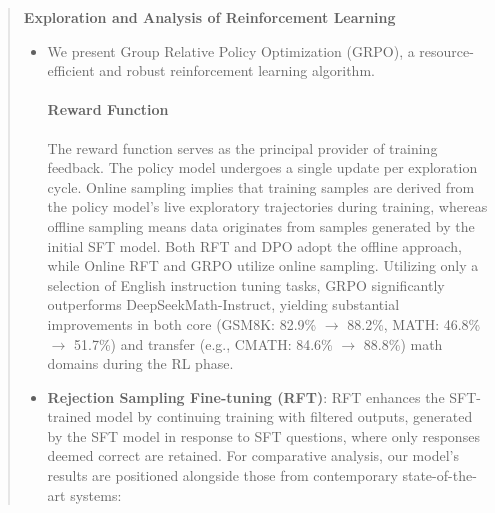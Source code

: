 \begin{abstract}
\textbf{Exploration and Analysis of Reinforcement Learning}

\begin{itemize}[topsep=0pt]
    \item We present Group Relative Policy Optimization (GRPO), a resource-efficient and robust reinforcement learning algorithm. \paragraph{Reward Function} The reward function serves as the principal provider of training feedback. The policy model undergoes a single update per exploration cycle. Online sampling implies that training samples are derived from the policy model's live exploratory trajectories during training, whereas offline sampling means data originates from samples generated by the initial SFT model. Both RFT and DPO adopt the offline approach, while Online RFT and GRPO utilize online sampling. Utilizing only a selection of English instruction tuning tasks, GRPO significantly outperforms DeepSeekMath-Instruct, yielding substantial improvements in both core (GSM8K: 82.9\% $\rightarrow$ 88.2\%, MATH: 46.8\% $\rightarrow$ 51.7\%) and transfer (e.g., CMATH: 84.6\% $\rightarrow$ 88.8\%) math domains during the RL phase. \item \textbf{Rejection Sampling Fine-tuning (RFT)}: RFT enhances the SFT-trained model by continuing training with filtered outputs, generated by the SFT model in response to SFT questions, where only responses deemed correct are retained. For comparative analysis, our model's results are positioned alongside those from contemporary state-of-the-art systems:


\end{itemize}
\end{abstract}
